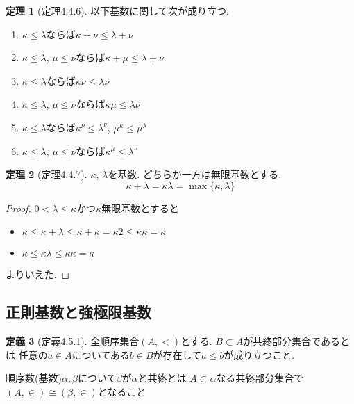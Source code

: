 \documentclass[dvipdfmx,a4paper,11pt]{report}
\theoremstyle{definition}
\newtheorem{thm}{定理}
\newtheorem{dfn}[thm]{定義}
\begin{document}
 \begin{tcolorbox}
 [colback = white, colframe = green!35!black, fonttitle = \bfseries,breakable = true]
\begin{thm}[定理4.4.6]
以下基数に関して次が成り立つ. 
\begin{enumerate}
\item $\kappa \le \lambda$ならば$\kappa +\nu\le \lambda+\nu$
\item $\kappa \le \lambda$, $\mu \le \nu $ならば$\kappa +\mu \le \lambda+\nu$
\item $\kappa \le \lambda$ならば$\kappa \nu\le \lambda\nu$
\item $\kappa \le \lambda$, $\mu \le \nu $ならば$\kappa \mu \le \lambda\nu$
\item $\kappa \le \lambda$ならば$\kappa^\nu\le \lambda^\nu$, $\mu^\kappa \le \mu^\lambda$
\item $\kappa \le \lambda$, $\mu \le \nu $ならば$\kappa^\mu \le \lambda^\nu$
\end{enumerate}
\end{thm}
\end{tcolorbox}

 \begin{tcolorbox}
 [colback = white, colframe = green!35!black, fonttitle = \bfseries,breakable = true]
\begin{thm}[定理4.4.7]
$\kappa$, $\lambda$を基数.
どちらか一方は無限基数とする. 
$$
\kappa + \lambda
=
\kappa \lambda
=
\max\{ \kappa , \lambda\}
$$
\end{thm}
\end{tcolorbox}
\begin{proof}
$0 < \lambda\le\kappa$かつ$\kappa$無限基数とすると
\begin{itemize}
\item $\kappa \le \kappa + \lambda \le \kappa+\kappa = \kappa2 \le \kappa\kappa=\kappa$
\item $\kappa \le \kappa\lambda \le\kappa\kappa=\kappa$
\end{itemize}
よりいえた. 
\end{proof}

\subsection{正則基数と強極限基数}
 \begin{tcolorbox}
 [colback = white, colframe = green!35!black, fonttitle = \bfseries,breakable = true]
\begin{dfn}[定義4.5.1]
全順序集合$(A,<)$とする. $B \subset A$が共終部分集合であるとは
任意の$a \in A$についてある$b \in B$が存在して$a\le b$が成り立つこと.

順序数(基数)$\alpha, \beta$について$\beta$が$\alpha$と共終とは
$A \subset \alpha$なる共終部分集合で$(A, \in) \cong (\beta, \in)$となること
\end{dfn}
\end{tcolorbox}
\end{document}
